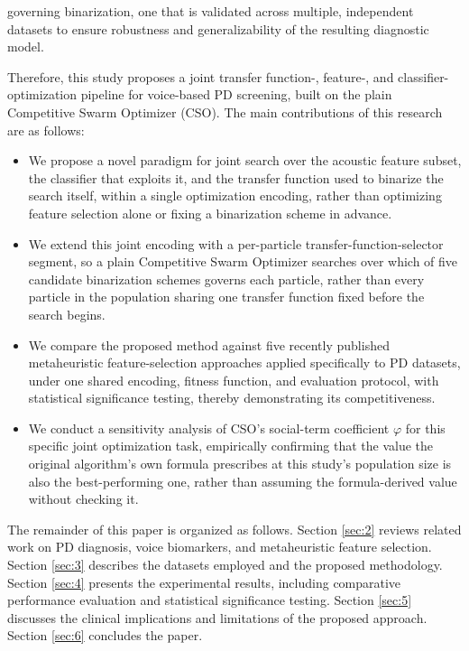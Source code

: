 governing binarization, one that is validated across multiple, independent datasets to ensure robustness and generalizability of the resulting diagnostic model.

Therefore, this study proposes a joint transfer function-, feature-, and classifier-optimization pipeline for voice-based PD screening, built on the plain Competitive Swarm Optimizer (CSO). The main contributions of this research are as follows:


\begin{itemize}
    \item We propose a novel paradigm for joint search over the acoustic feature subset, the classifier that exploits it, and the transfer function used to binarize the search itself, within a single optimization encoding, rather than optimizing feature selection alone or fixing a binarization scheme in advance.
    \item We extend this joint encoding with a per-particle transfer-function-selector segment, so a plain Competitive Swarm Optimizer searches over which of five candidate binarization schemes governs each particle, rather than every particle in the population sharing one transfer function fixed before the search begins.
    \item We compare the proposed method against five recently published metaheuristic feature-selection approaches applied specifically to PD datasets, under one shared encoding, fitness function, and evaluation protocol, with statistical significance testing, thereby demonstrating its competitiveness.
    \item We conduct a sensitivity analysis of CSO's social-term coefficient $\varphi$ for this specific joint optimization task, empirically confirming that the value the original algorithm's own formula prescribes at this study's population size is also the best-performing one, rather than assuming the formula-derived value without checking it.
\end{itemize}

The remainder of this paper is organized as follows. Section \ref{sec:2} reviews related work on PD diagnosis, voice biomarkers, and metaheuristic feature selection. Section \ref{sec:3} describes the datasets employed and the proposed methodology. Section \ref{sec:4} presents the experimental results, including comparative performance evaluation and statistical significance testing. Section \ref{sec:5} discusses the clinical implications and limitations of the proposed approach. Section \ref{sec:6} concludes the paper.

